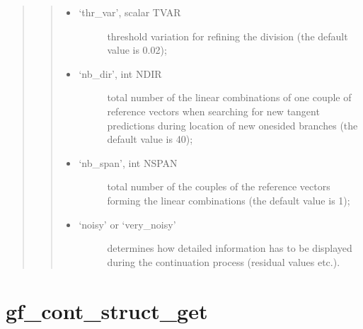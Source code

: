 \documentclass[a4paper,11pt,english]{sphinxmanual}
\begin{document}
\begin{quote}
\begin{quote}
\begin{itemize}
\begin{description}
\end{description}

\item {} \begin{description}
\item[{‘thr\_var’, scalar TVAR}] \leavevmode
\sphinxAtStartPar
threshold variation for refining the division (the default value is
0.02);

\end{description}

\item {} \begin{description}
\item[{‘nb\_dir’, int NDIR}] \leavevmode
\sphinxAtStartPar
total number of the linear combinations of one couple of reference
vectors when searching for new tangent predictions during location of
new one\sphinxhyphen{}sided branches (the default value is 40);

\end{description}

\item {} \begin{description}
\item[{‘nb\_span’, int NSPAN}] \leavevmode
\sphinxAtStartPar
total number of the couples of the reference vectors forming the
linear combinations (the default value is 1);

\end{description}

\item {} \begin{description}
\item[{‘noisy’ or ‘very\_noisy’}] \leavevmode
\sphinxAtStartPar
determines how detailed information has to be displayed during the
continuation process (residual values etc.).

\end{description}

\end{itemize}
\end{quote}
\end{quote}


\section{gf\_cont\_struct\_get}
\label{\detokenize{matlab_octave/cmdref_gf_cont_struct_get:gf-cont-struct-get}}\label{\detokenize{matlab_octave/cmdref_gf_cont_struct_get::doc}}
\sphinxAtStartPar
{}
\end{document}
